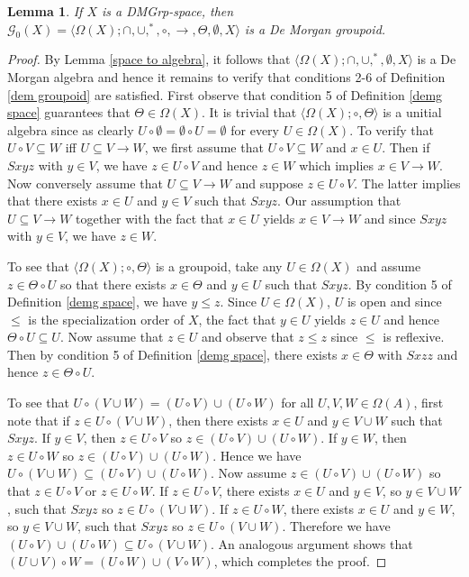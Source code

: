\documentclass{amsart}
\theoremstyle{plain}
\newtheorem{lemma}[theorem]{Lemma}
\theoremstyle{definition}
\begin{document}
\begin{lemma}\label{lemma 4.8}
    If $X$ is a DMGrp-space, then $\mathcal{G}_0(X)=\langle\Omega(X);\cap,\cup,^{*},\circ,\rightarrow,\Theta,\emptyset,X\rangle$ is a De Morgan groupoid. 
\end{lemma}
\begin{proof}
   By Lemma \ref{space to algebra}, it follows that $\langle\Omega(X);\cap,\cup,^*,\emptyset,X\rangle$ is a De Morgan algebra and hence it remains to verify that conditions 2-6 of Definition \ref{dem groupoid} are satisfied. First observe that condition 5 of Definition \ref{demg space} guarantees that $\Theta\in\Omega(X)$. It is trivial that $\langle\Omega(X);\circ,\Theta\rangle$ is a unitial algebra since as clearly $U\circ\emptyset=\emptyset\circ U=\emptyset$ for every $U\in\Omega(X)$. To verify that $U\circ V\subseteq W$ iff $U\subseteq V\rightarrow W$, we first assume that $U\circ V\subseteq W$ and $x\in U$. Then if $Sxyz$ with $y\in V$, we have $z\in U\circ V$ and hence $z\in W$ which implies $x\in V\rightarrow W$. Now conversely assume that $U\subseteq V\rightarrow W$ and suppose $z\in U\circ V$. The latter implies that there exists $x\in U$ and $y\in V$ such that $Sxyz$. Our assumption that $U\subseteq V\rightarrow W$ together with the fact that $x\in U$ yields $x\in V\rightarrow W$ and since $Sxyz$ with $y\in V$, we have $z\in W$. 

    To see that $\langle\Omega(X);\circ,\Theta\rangle$ is a groupoid, take any $U\in\Omega(X)$ and assume $z\in\Theta\circ U$ so that there exists $x\in\Theta$ and $y\in U$ such that $Sxyz$. By condition 5 of Definition \ref{demg space}, we have $y\leqslant z$. Since $U\in\Omega(X)$, $U$ is open and since $\leqslant$ is the specialization order of $X$, the fact that $y\in U$ yields $z\in U$ and hence $\Theta\circ U\subseteq U$.  Now assume that $z\in U$ and observe that $z\leqslant z$ since $\leqslant$ is reflexive. Then by condition 5 of Definition \ref{demg space}, there exists $x\in\Theta$ with $Sxzz$ and hence $z\in\Theta\circ U$.
    
    
    To see that $U\circ(V\cup W)=(U\circ V)\cup(U\circ W)$ for all $U,V,W\in\Omega(A)$, first note that if $z\in U\circ (V\cup W)$, then there exists $x\in U$ and $y\in V\cup W$ such that $Sxyz$. If $y\in V$, then $z\in U\circ V$ so $z\in (U\circ V)\cup(U\circ W)$. If $y\in W$, then $z\in U\circ W$ so $z\in (U\circ V)\cup(U\circ W)$. Hence we have $U\circ(V\cup W)\subseteq(U\circ V)\cup(U\circ W)$. Now assume $z\in (U\circ V)\cup(U\circ W)$ so that $z\in U\circ V$ or $z\in U\circ W$. If $z\in U\circ V$, there exists $x\in U$ and $y\in V$, so $y\in V\cup W$, such that $Sxyz$ so $z\in U\circ (V\cup W)$. If $z\in U\circ W$, there exists $x\in U$ and $y\in W$, so $y\in V\cup W$, such that $Sxyz$ so $z\in U\circ (V\cup W)$. Therefore we have $(U\circ V)\cup(U\circ W)\subseteq U\circ (V\cup W)$. An analogous argument shows that $(U\cup V)\circ W=(U\circ W)\cup(V\circ W)$, which completes the proof.       
\end{proof}
\end{document}
